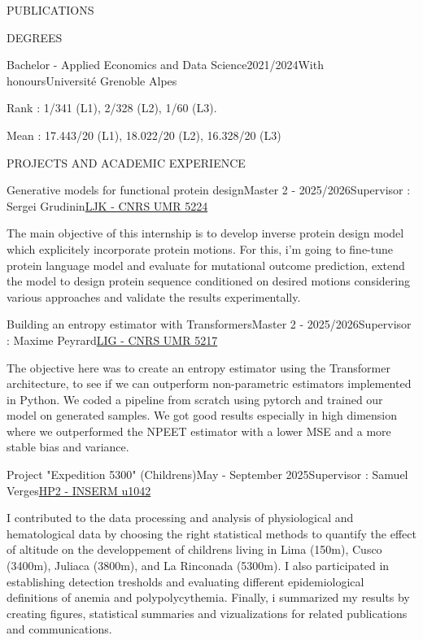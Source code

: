 \documentclass[11pt,a4paper]{resume}
\begin{document}
\begin{rSection}{PUBLICATIONS}
\begin{rSection}{DEGREES}
	\begin{rSubsection}{Bachelor - Applied Economics and Data Science}{2021/2024}{With honours}{Université Grenoble Alpes}
		\item Rank : 1/341 (L1), 2/328 (L2), 1/60 (L3). 
		\item Mean : 17.443/20 (L1), 18.022/20 (L2), 16.328/20 (L3)
	\end{rSubsection}

\end{rSection}

\begin{rSection}{PROJECTS AND ACADEMIC EXPERIENCE}

	\begin{rSubsection}{Generative models for functional protein design}{Master 2 - 2025/2026}{Supervisor : Sergei Grudinin}{\href{https://grulab.imag.fr/}{LJK - CNRS UMR 5224}}
		\item The main objective of this internship is to develop inverse protein design model which explicitely incorporate protein motions. For this, i'm going to fine-tune protein language model and evaluate for mutational outcome prediction, extend the model to design protein sequence conditioned on desired motions considering various approaches and validate the results experimentally.
	\end{rSubsection}

	\begin{rSubsection}{Building an entropy estimator with Transformers}{Master 2 - 2025/2026}{Supervisor : Maxime Peyrard}{\href{https://iab-grenoble.fr/}{LIG - CNRS UMR 5217}}
		\item The objective here was to create an entropy estimator using the Transformer architecture, to see if we can outperform non-parametric estimators implemented in Python. We coded a pipeline from scratch using pytorch and trained our model on generated samples. We got good results especially in high dimension where we outperformed the NPEET estimator with a lower MSE and a more stable bias and variance.
	\end{rSubsection}


	\begin{rSubsection}{Project "Expedition 5300" (Childrens)}{May - September 2025}{Supervisor : Samuel Verges}{\href{https://hp2.univ-grenoble-alpes.fr/fr}{HP2 - INSERM u1042}}
		\item I contributed to the data processing and analysis of physiological and hematological data by choosing the right statistical methods to quantify the effect of altitude on the developpement of childrens living in Lima (150m), Cusco (3400m), Juliaca (3800m), and La Rinconada (5300m). I also participated in establishing detection tresholds and evaluating different epidemiological definitions of anemia and polypolycythemia. Finally, i summarized my results by creating figures, statistical summaries and vizualizations for related publications and communications.
	\end{rSubsection}


\end{rSection}
\end{rSection}
\end{document}
